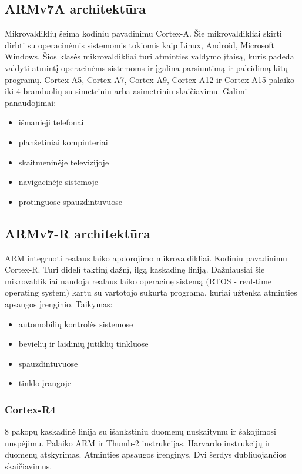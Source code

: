 \documentclass[a4paper, 12pt]{article} %
\begin{document}
\begin{onehalfspacing}
\subsection{ARMv7A architekt\={u}ra}
Mikrovaldikli\k{u} \v{s}eima kodiniu pavadinimu Cortex-A.
\v{S}ie mikrovaldikliai skirti dirbti su operacin\.{e}mis sistemomis tokiomis kaip Linux, Android, Microsoft Windows. \v{S}ios klas\.{e}s mikrovaldikliai turi atminties valdymo \k{i}tais\k{a}, kuris padeda valdyti atmint\k{i} operacin\.{e}ms sistemoms ir \k{i}galina parsiuntim\k{a} ir paleidim\k{a} kit\k{u} program\k{u}. Cortex-A5, Cortex-A7, Cortex-A9, Cortex-A12 ir Cortex-A15 palaiko iki 4 branduoli\k{u} su simetriniu arba asimetriniu skai\v{c}iavimu. Galimi panaudojimai:
\begin{itemize}
\item i\v{s}manieji telefonai
\item plan\v{s}etiniai kompiuteriai
\item skaitmenin\.{e}je televizijoje
\item navigacin\.{e}je sistemoje
\item protinguose spauzdintuvuose
\end{itemize}

\subsection{ARMv7-R architekt\={u}ra}
ARM integruoti realaus laiko apdorojimo mikrovaldikliai. Kodiniu pavadinimu Cortex-R. Turi didel\k{i} taktin\k{i} da\v{z}n\k{i}, ilg\k{a} kaskadin\k{e} linij\k{a}. Da\v{z}niausiai \v{s}ie mikrovaldikliai naudoja realaus laiko operacin\k{e} sistem\k{a} $($RTOS - real-time operating system$)$ kartu su vartotojo sukurta programa, kuriai u\v{z}tenka atminties apsaugos \k{i}renginio. Taikymas:
\begin{itemize}
\item automobili\k{u} kontrol\.{e}s sistemose
\item bevieli\k{u} ir laidini\k{u} jutikli\k{u} tinkluose
\item spauzdintuvuose
\item tinklo \k{i}rangoje
\end{itemize}
\subsubsection{Cortex-R4}
8 pakop\k{u} kaskadin\.{e} linija su i\v{s}ankstiniu duomen\k{u} nuskaitymu ir \v{s}akojimosi nusp\.{e}jimu. Palaiko ARM ir Thumb-2 instrukcijas. Harvardo instrukcij\k{u} ir duomen\k{u} atskyrimas. Atminties apsaugos \k{i}renginys. Dvi \v{s}erdys dubliuojan\v{c}ios skai\v{c}iavimus.  

\end{onehalfspacing}
\end{document}
